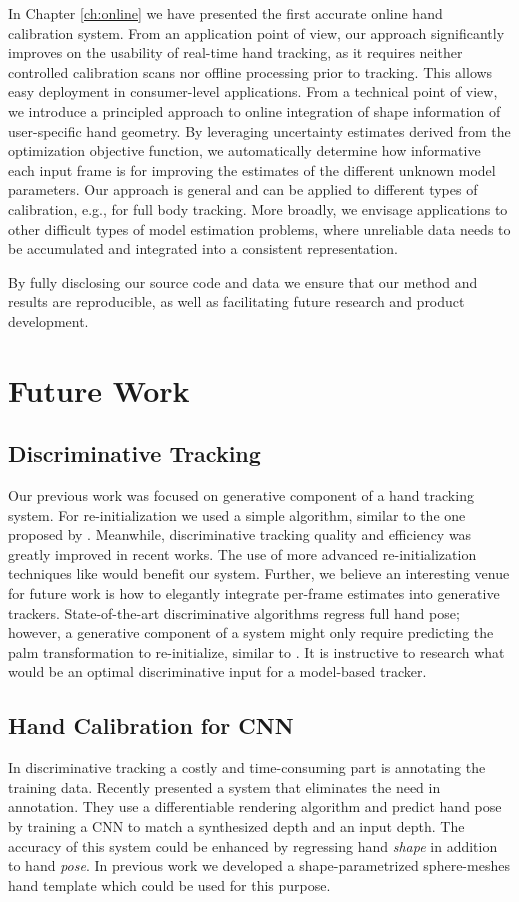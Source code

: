 In Chapter \ref{ch:online} we have presented the first accurate online hand calibration system. 
From an application point of view, our approach significantly improves on the usability of real-time hand tracking, as it requires neither controlled calibration scans nor offline processing prior to tracking. This allows easy deployment in consumer-level applications. From a technical point of view, we introduce a principled approach to online integration of shape information of user-specific hand geometry. By leveraging uncertainty estimates derived from the optimization objective function, we automatically determine how informative each input frame is for improving the estimates of the different unknown model parameters. Our approach is general and can be applied to different types of calibration, e.g., for full body tracking. More broadly, we envisage applications to other difficult types of model estimation problems, where unreliable data needs to be accumulated and integrated into a consistent representation.

By fully disclosing our source code and data we ensure that our method and results are reproducible, as well as facilitating future research and product development. 

\section {Future Work}

\subsection*{Discriminative Tracking}
Our previous work was focused on generative component of a hand tracking system. For re-initialization we used a simple algorithm, similar to the one proposed by \cite{qian2014realtime}. Meanwhile, discriminative tracking quality and efficiency was greatly improved in recent works. 
The use of more advanced re-initialization techniques like \cite{oberweger2017deepprior++} would benefit our system. Further, we believe an interesting venue for future work is how to elegantly integrate per-frame estimates into generative trackers. State-of-the-art discriminative algorithms regress full hand pose; however, a generative component of a system might only require predicting the palm transformation to re-initialize, similar to \cite{taylor2017articulated}. It is instructive to research what would be an optimal discriminative input for a model-based tracker.

\subsection*{Hand Calibration for CNN}
In discriminative tracking a costly and time-consuming part is annotating the training data. Recently \cite{ dibra2017refine} presented a system that eliminates the need in annotation. They use a differentiable rendering algorithm and predict hand pose by training a CNN to match a synthesized depth and an input depth. The accuracy of this system could be enhanced by regressing hand \textit{shape} in addition to hand \textit{pose}. In previous work we developed a shape-parametrized sphere-meshes hand template which could be used for this purpose.

